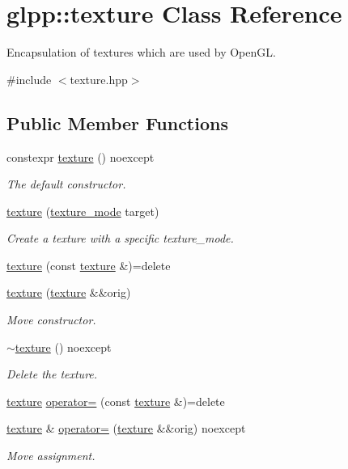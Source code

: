 \hypertarget{classglpp_1_1texture}{}\section{glpp\+:\+:texture Class Reference}
\label{classglpp_1_1texture}


Encapsulation of textures which are used by Open\+GL.  




{\ttfamily \#include $<$texture.\+hpp$>$}

\subsection*{Public Member Functions}
\begin{DoxyCompactItemize}
\item 
constexpr \hyperlink{classglpp_1_1texture_a185be01a6e7167e5fc8797df2fa927d3}{texture} () noexcept
\begin{DoxyCompactList}\small\item\em The default constructor. \end{DoxyCompactList}\item 
\hyperlink{classglpp_1_1texture_ae064901a9618b1f58f160cb3f587b4ce}{texture} (\hyperlink{namespaceglpp_a09dd2630cf15f1c3f3b4164c59cc7d26}{texture\+\_\+mode} target)
\begin{DoxyCompactList}\small\item\em Create a texture with a specific texture\+\_\+mode. \end{DoxyCompactList}\item 
\hyperlink{classglpp_1_1texture_a8cd0e24fd6db7a32c0bd1ff5228fd2b7}{texture} (const \hyperlink{classglpp_1_1texture}{texture} \&)=delete
\item 
\hyperlink{classglpp_1_1texture_a4b45a7d9c58d84913ec37f416ef766b5}{texture} (\hyperlink{classglpp_1_1texture}{texture} \&\&orig)
\begin{DoxyCompactList}\small\item\em Move constructor. \end{DoxyCompactList}\item 
\hyperlink{classglpp_1_1texture_a45a7e6426cde8199f0507c7618d2188e}{$\sim$texture} () noexcept
\begin{DoxyCompactList}\small\item\em Delete the texture. \end{DoxyCompactList}\item 
\hyperlink{classglpp_1_1texture}{texture} \hyperlink{classglpp_1_1texture_a4b57f18cf8ee0240acf75cd573ced480}{operator=} (const \hyperlink{classglpp_1_1texture}{texture} \&)=delete
\item 
\hyperlink{classglpp_1_1texture}{texture} \& \hyperlink{classglpp_1_1texture_a459d035c1f00aa3e83ed381515779b4a}{operator=} (\hyperlink{classglpp_1_1texture}{texture} \&\&orig) noexcept
\begin{DoxyCompactList}\small\item\em Move assignment. \end{DoxyCompactList}\end{DoxyCompactItemize}
